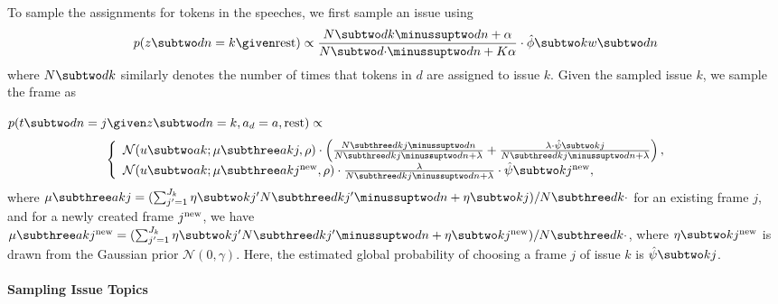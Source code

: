 To sample the assignments for tokens in the speeches, we first sample
an issue using
\begin{equation}
  p(z \subtwo dn = k \given \mbox{rest}) \propto
  \frac{N \subtwo dk \minussuptwo dn + \alpha}{N \subtwo d{\cdot} \minussuptwo dn + K \alpha} \cdot
  \hat{\phi} \subtwo k{w \subtwo dn}
  
\end{equation}
where $N \subtwo dk$ similarly denotes the number of times that tokens
in $d$ are assigned to issue $k$. Given the sampled issue $k$, we
sample the frame as 

$p(t \subtwo dn = j \given z \subtwo dn = k, a_d =
a, \mbox{rest}) \propto$
\begin{equation}
\left\{
  \begin{array}{ll}
    \mathcal{N}(u \subtwo ak; \mu \subthree akj, \rho) \cdot
     \left(\frac{N \subthree dkj \minussuptwo dn}{N \subthree dkj \minussuptwo dn + \lambda} +
        \frac{\lambda \cdot \hat{\psi} \subtwo kj}{N \subthree dkj \minussuptwo dn + \lambda }
        \right),
     & \\
     \mathcal{N}(u \subtwo ak; \mu \subthree ak{j^{\mbox{\scriptsize new}}}, \rho) \cdot
     \frac{\lambda}{N \subthree dkj \minussuptwo dn + \lambda} \cdot
        \hat{\psi} \subtwo k{j^{\mbox{\scriptsize new}}}
        
        ,
     &
  \end{array}
\right.
\label{eqn:c6_sample_t}
\end{equation}
where $\mu \subthree akj = (\sum_{j'=1}^{J_k} \eta \subtwo k{j'} N \subthree dk{j'} \minussuptwo dn
+ \eta \subtwo kj) /  N \subthree dk{\cdot}$ for an existing frame $j$, and for a newly created
frame $j^{\mbox{\scriptsize new}}$, we have $\mu \subthree ak{j^{\mbox{\scriptsize new}}} =
(\sum_{j'=1}^{J_k} \eta \subtwo k{j'} N \subthree dk{j'} \minussuptwo dn + \eta \subtwo
k{j^{\mbox{\scriptsize new}}}) /  N \subthree dk{\cdot}$, where $\eta \subtwo
k{j^{\mbox{\scriptsize new}}}$ is drawn from the Gaussian prior $\mathcal{N}(0, \gamma)$. Here, the
estimated global probability of choosing a frame $j$ of issue $k$ is $\hat{\psi} \subtwo kj$. 


\paragraph{Sampling Issue Topics}

